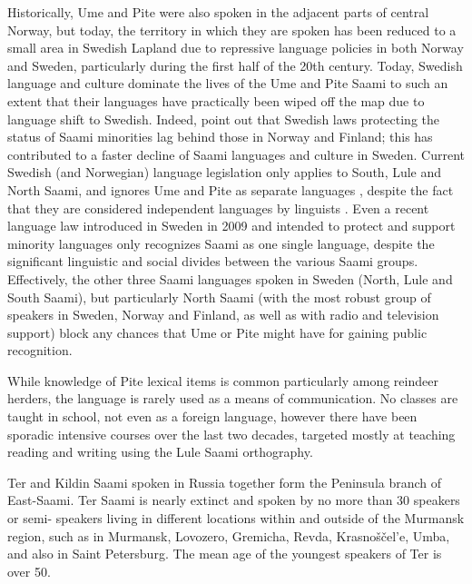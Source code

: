 \documentclass[a4paper,12pt]{article}
\begin{document}
Historically, Ume and Pite were also spoken in the adjacent parts of central Norway, but today, the territory in which they are spoken has been reduced to a small area in Swedish Lapland due to repressive language policies in both Norway and Sweden, particularly during the first half of the 20th century. Today, Swedish language and culture dominate the lives of the Ume and Pite Saami to such an extent that their languages have practically been wiped off the map due to language shift to Swedish. Indeed, \citet[123]{blokland-etal2003} point out that Swedish laws protecting the status of Saami minorities lag behind those in Norway and Finland; this has contributed to a faster decline of Saami languages and culture in Sweden. Current Swedish (and Norwegian) language legislation only applies to South, Lule and North Saami, and ignores Ume and Pite as separate languages \cite[180]{kulonen-etal2005}, despite the fact that they are considered independent languages by linguists \citep[cf.][]{gordon 2005;sammallahti1998b}. Even a recent language law introduced in Sweden in 2009 and intended to protect and support minority languages only recognizes Saami as one single language, despite the significant linguistic and social divides between the various Saami groups. Effectively, the other three Saami languages spoken in Sweden (North, Lule and South Saami), but particularly North Saami (with the most robust group of speakers in Sweden, Norway and Finland, as well as with radio and television support) block any chances that Ume or Pite might have for gaining public recognition. 

While knowledge of Pite lexical items is common particularly among reindeer herders, the language is rarely used as a means of communication. No classes are taught in school, not even as a foreign language, however there have been sporadic intensive courses over the last two decades, targeted mostly at teaching reading and writing using the Lule Saami orthography.

Ter and Kildin Saami spoken in Russia together form the Peninsula branch of East-Saami. Ter Saami is nearly extinct and spoken by no more than 30 speakers or semi- speakers living in different locations within and outside of the Murmansk region, such as in Murmansk, Lovozero, Gremicha, Revda, Krasnoščel'e, Umba, and also in Saint Petersburg. The mean age of the youngest speakers of Ter is over 50.%
\end{document}
